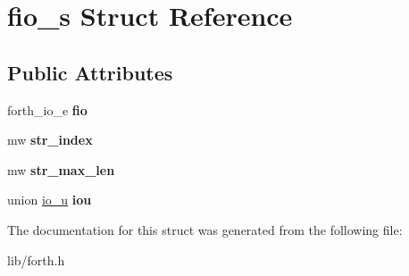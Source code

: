 \hypertarget{structfio__s}{\section{fio\-\_\-s Struct Reference}
\label{structfio__s}
}
\subsection*{Public Attributes}
\begin{DoxyCompactItemize}
\item 
\hypertarget{structfio__s_acbbc17cdfcfc9190ed0af199670fba33}{forth\-\_\-io\-\_\-e {\bfseries fio}}\label{structfio__s_acbbc17cdfcfc9190ed0af199670fba33}

\item 
\hypertarget{structfio__s_a6a40f69645ccdcc90111dd97c9e98027}{mw {\bfseries str\-\_\-index}}\label{structfio__s_a6a40f69645ccdcc90111dd97c9e98027}

\item 
\hypertarget{structfio__s_ad6ec0b91021e511e2e9df2c068858c74}{mw {\bfseries str\-\_\-max\-\_\-len}}\label{structfio__s_ad6ec0b91021e511e2e9df2c068858c74}

\item 
\hypertarget{structfio__s_a3f24ec109b199f9500d313a19b62b304}{union \hyperlink{unionio__u}{io\-\_\-u} {\bfseries iou}}\label{structfio__s_a3f24ec109b199f9500d313a19b62b304}

\end{DoxyCompactItemize}


The documentation for this struct was generated from the following file\-:\begin{DoxyCompactItemize}
\item 
lib/forth.\-h\end{DoxyCompactItemize}
